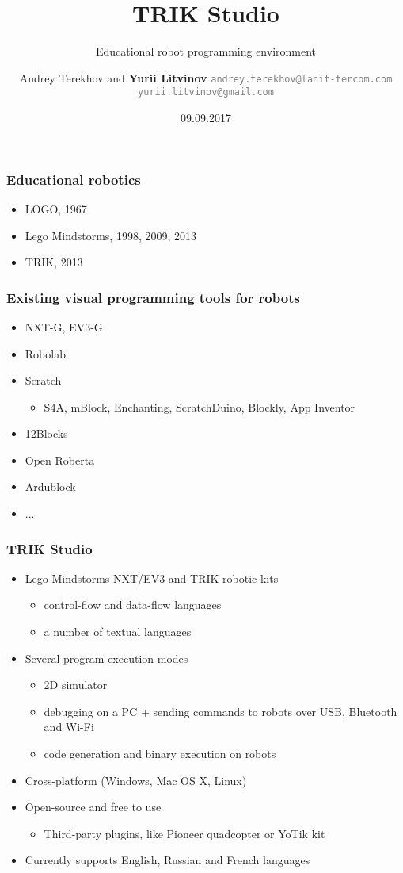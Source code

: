 \documentclass[xetex,mathserif,serif]{beamer}
\title{TRIK Studio}
\subtitle{Educational robot programming environment}
\author[Yurii Litvinov]{Andrey Terekhov and \textbf{Yurii Litvinov} \newline \textcolor{gray}{\small\texttt{andrey.terekhov@lanit-tercom.com}} \newline \textcolor{gray}{\small\texttt{yurii.litvinov@gmail.com}}}
\date{09.09.2017}
\begin{document}
	
	\frame{\titlepage}
	
	\begin{frame}
		\frametitle{Educational robotics}
		\begin{itemize}
			\item LOGO, 1967
			\item Lego Mindstorms, 1998, 2009, 2013
			\item TRIK, 2013
		\end{itemize}
	\end{frame}

	\begin{frame}
		\frametitle{Existing visual programming tools for robots}
		\begin{itemize}
			\item NXT-G, EV3-G
			\item Robolab
			\item Scratch
			\begin{itemize}
				\item S4A, mBlock, Enchanting, ScratchDuino, Blockly, App Inventor
			\end{itemize}
			\item 12Blocks
			\item Open Roberta
			\item Ardublock
			\item ...
		\end{itemize}
	\end{frame}

	\begin{frame}
		\frametitle{TRIK Studio}
		\begin{itemize}
			\item Lego Mindstorms NXT/EV3 and TRIK robotic kits
			\begin{itemize}
				\item control-flow and data-flow languages
				\item a number of textual languages
			\end{itemize}
			\item Several program execution modes
			\begin{itemize}
				\item 2D simulator
				\item debugging on a PC + sending commands to robots over USB, Bluetooth and Wi-Fi
				\item code generation and binary execution on robots
			\end{itemize}
			\item Cross-platform (Windows, Mac OS X, Linux)
			\item Open-source and free to use
			\begin{itemize}
				\item Third-party plugins, like Pioneer quadcopter or YoTik kit
			\end{itemize}
			\item Currently supports English, Russian and French languages
		\end{itemize}
	\end{frame}
\end{document}
